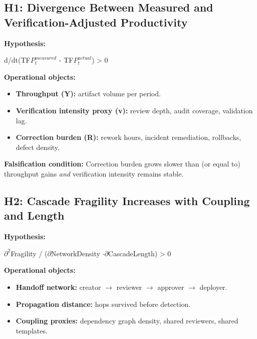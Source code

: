 \documentclass[11pt,a4paper]{article}
\providecommand{\tightlist}{\setlength{\itemsep}{0pt}\setlength{\parskip}{0pt}}
\begin{document}
\hypertarget{h1-divergence-between-measured-and-verification-adjusted-productivity}{%
\subsection{ H1: Divergence Between Measured and Verification-Adjusted Productivity}\label{h1-divergence-between-measured-and-verification-adjusted-productivity}}

\textbf{Hypothesis:}

d/dt(TF$P_t^{measured}$ - TF$P_t^{actual}$) > 0

\textbf{Operational objects:}

\begin{itemize}
\tightlist
\item
  \textbf{Throughput (Y):} artifact volume per period.
\item
  \textbf{Verification intensity proxy (v):} review depth, audit coverage, validation lag.
\item
  \textbf{Correction burden (R):} rework hours, incident remediation, rollbacks, defect density.
\end{itemize}

\textbf{Falsification condition:} Correction burden grows slower than (or equal to) throughput gains \emph{and} verification intensity remains stable.

\hypertarget{h2-cascade-fragility-increases-with-coupling-and-length}{%
\subsection{ H2: Cascade Fragility Increases with Coupling and Length}\label{h2-cascade-fragility-increases-with-coupling-and-length}}

\textbf{Hypothesis:}

$\partial^2$Fragility / ($\partial$NetworkDensity $\cdot \partial$CascadeLength) > 0

\textbf{Operational objects:}

\begin{itemize}
\tightlist
\item
  \textbf{Handoff network:} creator $\to$ reviewer $\to$ approver $\to$ deployer.
\item
  \textbf{Propagation distance:} hops survived before detection.
\item
  \textbf{Coupling proxies:} dependency graph density, shared reviewers, shared templates.
\end{itemize}
\end{document}
